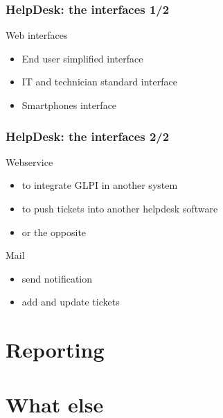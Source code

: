 \documentclass{beamer}
\begin{document}
\begin{frame}

    \frametitle{HelpDesk: the interfaces 1/2}

    \begin{block}{Web interfaces}
        \begin{itemize}
            \item End user simplified interface
            \item IT and technician standard interface
            \item Smartphones interface
        \end{itemize}
    \end{block}

\end{frame}
\begin{frame}

    \frametitle{HelpDesk: the interfaces 2/2}

    \begin{block}{Webservice}
        \begin{itemize}
            \item to integrate GLPI in another system
            \item to push tickets into another helpdesk software
            \item or the opposite
        \end{itemize}
    \end{block}

    \begin{block}{Mail}
       \begin{itemize}
            \item send notification
            \item add and update tickets
       \end{itemize}
    \end{block}


\end{frame}

\section{Reporting}

\section{What else}
\end{document}
